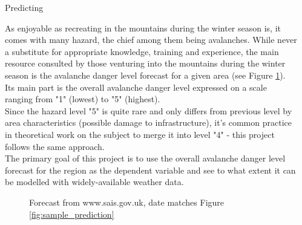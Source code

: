 \documentclass[final]{beamer}
\newlength{\sepwidth}
\newlength{\colwidth}
\newcommand{\separatorcolumn}{\begin{column}{\sepwidth}\end{column}}
\begin{document}
\begin{frame}[t]
\begin{columns}[t]
\separatorcolumn

\begin{column}{\colwidth}

\begin{block}{Predicting}


    As enjoyable as recreating in the mountains during the winter season is, it comes with many hazard, the chief among them being avalanches. While never a substitute for appropriate knowledge, training and experience, the main resource consulted by those venturing into the mountains during the winter season is the avalanche danger level forecast for a given area (see Figure \ref{fig:sample_report}). \\
   	Its main part is the overall avalanche danger level expressed on a scale ranging from "1" (lowest) to "5" (highest). \newline
    \\
    Since the hazard level "5" is quite rare and only differs from previous level by area characteristics (possible damage to infrastructure), it's common practice in theoretical work on the subject to merge it into level "4" - this project follows the same approach. \newline
    \\
	The primary goal of this project is to use the overall avalanche danger level forecast for the region as the dependent variable and see to what extent it can be modelled with widely-available weather data.

    	\begin{figure}[h]
		\centering
			\caption{Forecast from www.sais.gov.uk, date matches Figure \ref{fig:sample_prediction}}
		\label{fig:sample_report}
	\end{figure}


\end{block}
\end{column}
\end{columns}
\end{frame}
\end{document}

